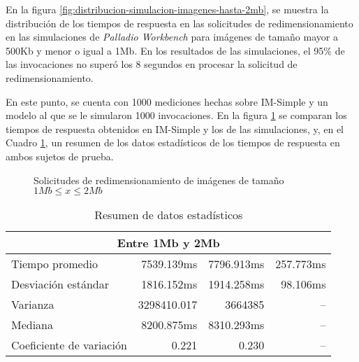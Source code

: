 En la figura \ref{fig:distribucion-simulacion-imagenes-hasta-2mb}, se muestra la distribución de los tiempos de respuesta en las solicitudes de redimensionamiento en las simulaciones de \emph{Palladio Workbench} para imágenes de tamaño mayor a 500Kb y menor o igual a 1Mb. En los resultados de las simulaciones, el 95\% de las invocaciones no superó los 8 segundos en procesar la solicitud de redimensionamiento.

En este punto, se cuenta con 1000 mediciones hechas sobre IM-Simple y un modelo al que se le simularon 1000 invocaciones. En la figura \ref{fig:comparacion-imsimple-palladio-2mb} se comparan los tiempos de respuesta obtenidos en IM-Simple y los de las simulaciones, y, en el Cuadro \ref{table:datos-estadisticos-hasta-2mb}, un resumen de los datos estadísticos de los tiempos de respuesta en ambos sujetos de prueba.

\begin{figure}
\hspace{-1cm}
\caption{Solicitudes de redimensionamiento de imágenes de tamaño $1Mb \leq x \leq 2Mb$}
\label{fig:comparacion-imsimple-palladio-2mb}
\end{figure}

\begin{table}
    \centering
    \begin{tabular}{l|r|r|r}
        \toprule[1.5pt]
         \multicolumn{4}{c}{\textbf{Entre 1Mb y 2Mb}} \\
         \midrule 
        Tiempo promedio  & 7539.139ms & 7796.913ms & 257.773ms\\
        Desviación estándar & 1816.152ms & 1914.258ms & 98.106ms \\
        Varianza & 3298410.017 & 3664385 & -- \\
        Mediana & 8200.875ms & 8310.293ms & -- \\
        Coeficiente de variación & 0.221 & 0.230 & -- \\                        
        \bottomrule[1.5pt]
    \end{tabular}
    \caption{Resumen de datos estadísticos}
    \label{table:datos-estadisticos-hasta-2mb}
\end{table}

